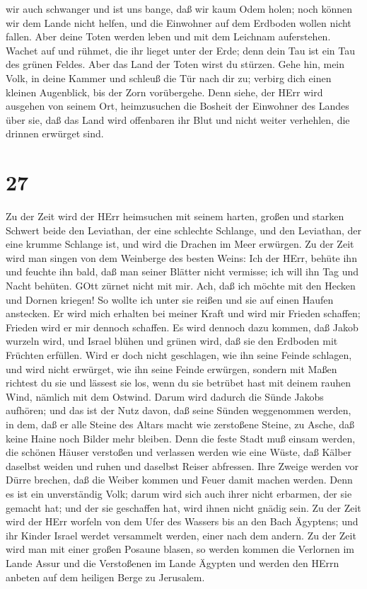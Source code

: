 wir auch schwanger und ist uns bange, daß wir kaum Odem holen; noch
können wir dem Lande nicht helfen, und die Einwohner auf dem Erdboden
wollen nicht fallen.  Aber deine Toten werden leben und mit
dem Leichnam auferstehen. Wachet auf und rühmet, die ihr lieget unter
der Erde; denn dein Tau ist ein Tau des grünen Feldes. Aber das Land der
Toten wirst du stürzen.  Gehe hin, mein Volk, in deine
Kammer und schleuß die Tür nach dir zu; verbirg dich einen kleinen
Augenblick, bis der Zorn vorübergehe.  Denn siehe, der HErr
wird ausgehen von seinem Ort, heimzusuchen die Bosheit der Einwohner des
Landes über sie, daß das Land wird offenbaren ihr Blut und nicht weiter
verhehlen, die drinnen erwürget sind.

\hypertarget{section-26}{%
\section{27}\label{section-26}}

 Zu der Zeit wird der HErr heimsuchen mit seinem harten,
großen und starken Schwert beide den Leviathan, der eine schlechte
Schlange, und den Leviathan, der eine krumme Schlange ist, und wird die
Drachen im Meer erwürgen.  Zu der Zeit wird man singen von
dem Weinberge des besten Weins:  Ich der HErr, behüte ihn
und feuchte ihn bald, daß man seiner Blätter nicht vermisse; ich will
ihn Tag und Nacht behüten.  GOtt zürnet nicht mit mir. Ach,
daß ich möchte mit den Hecken und Dornen kriegen! So wollte ich unter
sie reißen und sie auf einen Haufen anstecken.  Er wird mich
erhalten bei meiner Kraft und wird mir Frieden schaffen; Frieden wird er
mir dennoch schaffen.  Es wird dennoch dazu kommen, daß
Jakob wurzeln wird, und Israel blühen und grünen wird, daß sie den
Erdboden mit Früchten erfüllen.  Wird er doch nicht
geschlagen, wie ihn seine Feinde schlagen, und wird nicht erwürget, wie
ihn seine Feinde erwürgen,  sondern mit Maßen richtest du
sie und lässest sie los, wenn du sie betrübet hast mit deinem rauhen
Wind, nämlich mit dem Ostwind.  Darum wird dadurch die Sünde
Jakobs aufhören; und das ist der Nutz davon, daß seine Sünden
weggenommen werden, in dem, daß er alle Steine des Altars macht wie
zerstoßene Steine, zu Asche, daß keine Haine noch Bilder mehr bleiben.
 Denn die feste Stadt muß einsam werden, die schönen Häuser
verstoßen und verlassen werden wie eine Wüste, daß Kälber daselbst
weiden und ruhen und daselbst Reiser abfressen.  Ihre
Zweige werden vor Dürre brechen, daß die Weiber kommen und Feuer damit
machen werden. Denn es ist ein unverständig Volk; darum wird sich auch
ihrer nicht erbarmen, der sie gemacht hat; und der sie geschaffen hat,
wird ihnen nicht gnädig sein.  Zu der Zeit wird der HErr
worfeln von dem Ufer des Wassers bis an den Bach Ägyptens; und ihr
Kinder Israel werdet versammelt werden, einer nach dem andern.
 Zu der Zeit wird man mit einer großen Posaune blasen, so
werden kommen die Verlornen im Lande Assur und die Verstoßenen im Lande
Ägypten und werden den HErrn anbeten auf dem heiligen Berge zu
Jerusalem.

